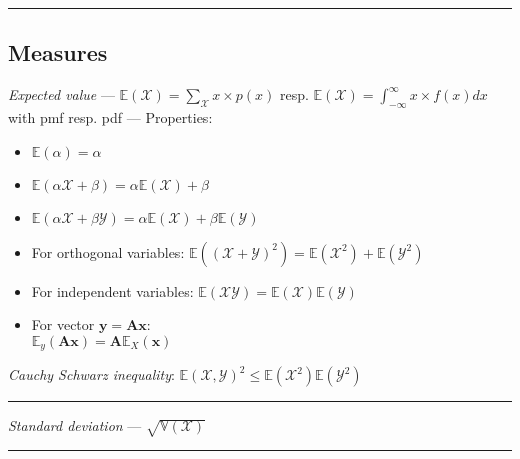 {\color{black}\hrule height 0.001mm}

\subsection*{Measures}
\emph{Expected value} --- 
$\mathbb{E}(\mathcal{X}) = \sum_{\mathcal{X}}x \times p(x)$ resp. $\mathbb{E}(\mathcal{X}) = \int_{-\infty}^{\infty}x \times f(x)dx$ with pmf resp. pdf --- Properties:
\begin{multicols}{2}
\begin{itemize}
    \item $\mathbb{E}(\alpha)=\alpha$
    \item $\mathbb{E}(\alpha\mathcal{X}+\beta)=\alpha\mathbb{E}(\mathcal{X})+\beta$
    \item $\mathbb{E}(\alpha\mathcal{X} + \beta\mathcal{Y})=\alpha\mathbb{E}(\mathcal{X})+\beta\mathbb{E}(\mathcal{Y})$
    \item For orthogonal variables:
    $\mathbb{E}((\mathcal{X}+\mathcal{Y})^2)=\mathbb{E}(\mathcal{X}^2) + \mathbb{E}(\mathcal{Y}^2)$
    \item For independent variables: $\mathbb{E}(\mathcal{X}\mathcal{Y})=\mathbb{E}(\mathcal{X})\mathbb{E}(\mathcal{Y})$
    \item For vector $\boldsymbol{y} = \boldsymbol{A}\boldsymbol{x}$:\\$\mathbb{E}_y(\boldsymbol{A}\boldsymbol{x})=\boldsymbol{A}\mathbb{E}_X(\boldsymbol{x})$
\end{itemize}
\end{multicols}
\emph{Cauchy Schwarz inequality}: $\mathbb{E}(\mathcal{X},\mathcal{Y})^2 \leq \mathbb{E}(\mathcal{X}^2)\mathbb{E}(\mathcal{Y}^2)$

{\color{lightgray}\hrule height 0.001mm}

\emph{Standard deviation} --- $\sqrt{\mathbb{V}(\mathcal{X})}$

{\color{lightgray}\hrule height 0.001mm}

